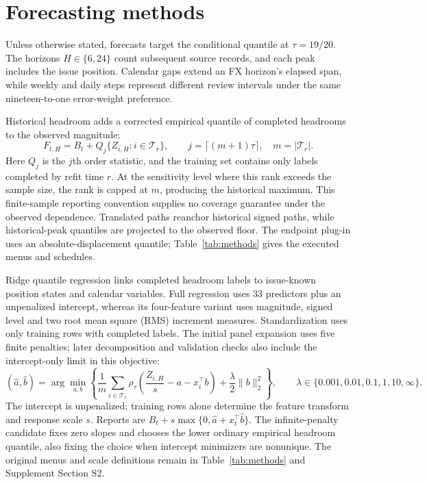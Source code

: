 \documentclass[11pt,a4paper]{article}
\begin{document}


\FloatBarrier

\section{Forecasting methods}\label{sec:methods}

Unless otherwise stated, forecasts target the conditional quantile at \(\tau=19/20\). The horizons \(H\in\{6,24\}\) count subsequent source records, and each peak includes the issue position. Calendar gaps extend an FX horizon's elapsed span, while weekly and daily steps represent different review intervals under the same nineteen-to-one error-weight preference.

Historical headroom adds a corrected empirical quantile of completed headrooms to the observed magnitude:
\[
F_{t,H}=B_t+Q_j\{Z_{i,H}:i\in\mathcal T_r\},\qquad
j=\lceil(m+1)\tau\rceil,\quad m=|\mathcal T_r|.
\]
Here \(Q_j\) is the \(j\)th order statistic, and the training set contains only labels completed by refit time \(r\).
At the sensitivity level where this rank exceeds the sample size, the rank is capped at \(m\), producing the historical maximum.
This finite-sample reporting convention supplies no coverage guarantee under the observed dependence. Translated paths reanchor historical signed paths, while historical-peak quantiles are projected to the observed floor. The endpoint plug-in uses an absolute-displacement quantile; Table~\ref{tab:methods} gives the executed menus and schedules.

Ridge quantile regression links completed headroom labels to issue-known position states and calendar variables. Full regression uses 33 predictors plus an unpenalized intercept, whereas its four-feature variant uses magnitude, signed level and two root mean square (RMS) increment measures. Standardization uses only training rows with completed labels. The initial panel expansion uses five finite penalties; later decomposition and validation checks also include the intercept-only limit in this objective:
\[
(\hat a,\hat b)=\arg\min_{a,b}\left\{
\frac1m\sum_{i\in\mathcal T_r}\rho_\tau\!\left(\frac{Z_{i,H}}s-a-x_i^\top b\right)
+\frac\lambda2\|b\|_2^2\right\},\qquad
\lambda\in\{0.001,0.01,0.1,1,10,\infty\}.
\]
The intercept is unpenalized; training rows alone determine the feature transform and response scale \(s\).
Reports are \(B_t+s\max\{0,\hat a+x_t^\top\hat b\}\). The infinite-penalty candidate fixes zero slopes and chooses the lower ordinary empirical headroom quantile, also fixing the choice when intercept minimizers are nonunique.
The original menus and scale definitions remain in Table~\ref{tab:methods} and Supplement Section S2.
\end{document}
